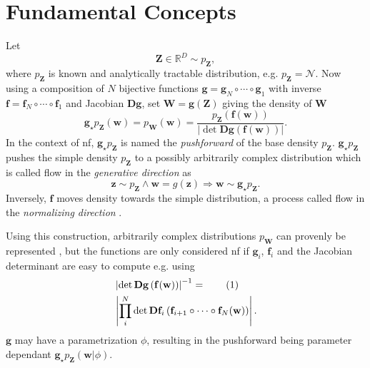 \documentclass[12pt,fleqn,twocolumn]{article}
\newcommand{\ginv}{\mathbf f}
\newcommand{\push}{\mathbf g_\star p_\mathbf Z}
\newcommand{\numberthis}{\addtocounter{equation}{1}\tag{\theequation}}
\newcommand{\RR}{\ensuremath{\mathbb R}}
\newcommand{\reci}{\ensuremath{^{-1}}}
\begin{document}
\section*{Fundamental Concepts}%
Let 
\begin{equation}
    \mathbf Z \in \RR^D \sim p_\mathbf Z,
\end{equation}
where $p_\mathbf Z$ is known and analytically tractable distribution, e.g. $p_\mathbf Z=\mathcal N$.
Now using a composition of $N$ bijective functions $\mathbf g=\mathbf g_N \circ \cdots \circ \mathbf g_1$ with inverse $\ginv=\ginv_N \circ \cdots \circ \ginv_1$ and Jacobian $\mathbf D\mathbf g$,
set $\mathbf W=\mathbf g (\mathbf Z)$ giving the density of $\mathbf W$
\begin{equation}\label{eq:dens}
    \push(\mathbf w)= p_\mathbf W(\mathbf w)=\frac{p_\mathbf Z \left(\ginv(\mathbf w)\right)}{\left| \det \mathbf D\mathbf g\left(\ginv(\mathbf w)\right) \right|}.
\end{equation}
In the context of \acrshort{nf}, $\push$ is named the \emph{pushforward} of the base density $p_\mathbf Z$.
$\push$ pushes the simple density $p_\mathbf Z$ to a possibly arbitrarily complex distribution which is called flow in the \emph{generative direction} \cite{koby2021nf} as
\begin{equation}\label{eq:gen}
    \mathbf z \sim p_\mathbf Z \wedge \mathbf w=g(\mathbf z) \Rightarrow \mathbf w \sim \push.
\end{equation}
Inversely, $\ginv$ moves density towards the simple distribution, a process called flow in the \emph{normalizing direction} \cite{koby2021nf}.

Using this construction, arbitrarily complex distributions $p_\mathbf W$ can provenly be represented \cite{boga2007triang}, but the functions are only considered \acrshort{nf} if $\mathbf g_i$, $\ginv_i$ and the Jacobian determinant are easy to compute \cite{koby2021nf} e.g. using 
\begin{align*}
    &\left| \det \mathbf D\mathbf g\left(\ginv(\mathbf w)\right) \right| \reci 
    =\numberthis\\
    &\left| \prod_i^N \det\mathbf D \ginv_i\left(\ginv_{i+1}\circ \cdots \circ \ginv_N(\mathbf w) \right)  \right|.
\end{align*}
$\mathbf g$ may have a parametrization $\phi$, resulting in the pushforward being parameter dependant $\push(\mathbf w|\phi)$.
\end{document}
